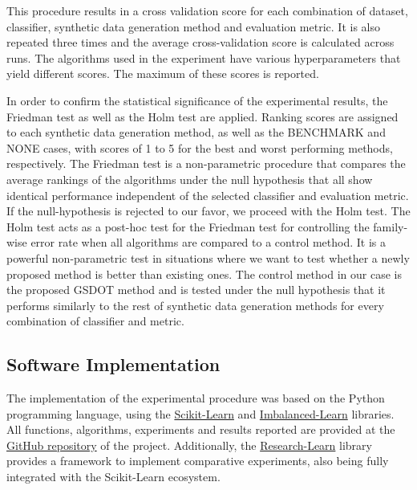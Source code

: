 This procedure results in a cross validation score for each combination of dataset, classifier, synthetic data generation method and evaluation metric. It is also repeated three times and the average cross-validation score is calculated across runs. The algorithms used in the experiment have various hyperparameters that yield different scores. The maximum of these scores is reported.

In order to confirm the statistical significance of the experimental results, the Friedman test as well as the Holm test \cite{JanezDemsar.2006} are applied. Ranking scores are assigned to each synthetic data generation method, as well as the BENCHMARK and NONE cases, with scores of 1 to 5 for the best and worst performing methods, respectively. The Friedman test is a non-parametric procedure that compares the average rankings of the algorithms under the null hypothesis that all show identical performance independent of the selected classifier and evaluation metric. If the null-hypothesis is rejected to our favor, we proceed with the Holm test. The Holm test acts as a post-hoc test for the Friedman test for controlling the family-wise error rate when all algorithms are compared to a control method. It is a powerful non-parametric test in situations where we want to test whether a newly proposed method is better than existing ones. The control method in our case is the proposed GSDOT method and is tested under the null hypothesis that it performs similarly to the rest of synthetic data generation methods for every combination of classifier and metric.

\subsection{Software Implementation}

The implementation of the experimental procedure was based on the Python
programming language, using the \href{https://scikit-learn.org/stable/}{Scikit-Learn} \cite{Pedregosa.2011} and \href{https://imbalanced-learn.org/en/stable/}{Imbalanced-Learn} \cite{Lemaitre.2017} libraries. All functions, algorithms, experiments and results reported are provided at the \href{https://github.com/AlgoWit/publications/tree/master/small-data-oversampling}{GitHub repository} of the project. Additionally, the \href{https://research-learn.readthedocs.io/en/latest/?badge=latest}{Research-Learn} library provides a framework to implement comparative experiments, also being fully integrated with the Scikit-Learn ecosystem.

